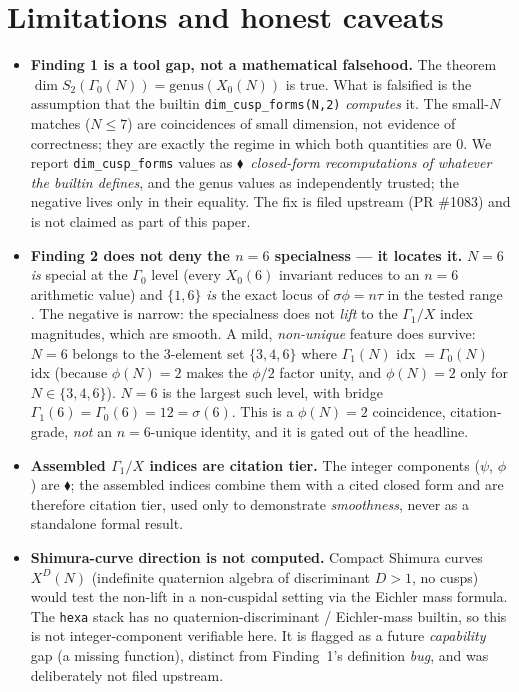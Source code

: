 \documentclass[11pt,a4paper]{article}
\newcommand{\tierF}{\textcolor{blue!60!black}{$\blacklozenge$}}   %
\newcommand{\sig}{\sigma}
\newcommand{\Gz}{\Gamma_0}
\newcommand{\Go}{\Gamma_1}
\theoremstyle{definition}
\begin{document}
\section{Limitations and honest caveats}
\label{sec:caveats}

\begin{itemize}\itemsep0.3em
\item \textbf{Finding 1 is a tool gap, not a mathematical falsehood.} The
theorem $\dim S_2(\Gz(N))=\mathrm{genus}(X_0(N))$ is true. What is falsified is
the assumption that the builtin \texttt{dim\_cusp\_forms(N,2)} \emph{computes}
it. The small-$N$ matches ($N\le 7$) are coincidences of small dimension, not
evidence of correctness; they are exactly the regime in which both quantities are
$0$. We report \texttt{dim\_cusp\_forms} values as \tierF\ \emph{closed-form
recomputations of whatever the builtin defines}, and the genus values as
independently trusted; the negative lives only in their equality. The fix is
filed upstream (PR \#1083) and is not claimed as part of this paper.

\item \textbf{Finding 2 does not deny the $n=6$ specialness --- it locates it.}
$N=6$ \emph{is} special at the $\Gz$ level (every $X_0(6)$ invariant reduces to
an $n=6$ arithmetic value) and $\{1,6\}$ \emph{is} the exact locus of
$\sig\phi=n\tau$ in the tested range \citep{tecs-l-locus}. The negative is
narrow: the specialness does not \emph{lift} to the $\Go/X$ index magnitudes,
which are smooth. A mild, \emph{non-unique} feature does survive: $N=6$ belongs
to the $3$-element set $\{3,4,6\}$ where $\Go(N)$ idx $=\Gz(N)$ idx (because
$\phi(N)=2$ makes the $\phi/2$ factor unity, and $\phi(N)=2$ only for
$N\in\{3,4,6\}$). $N=6$ is the largest such level, with bridge
$\Go(6)=\Gz(6)=12=\sig(6)$. This is a $\phi(N)=2$ coincidence, citation-grade,
\emph{not} an $n=6$-unique identity, and it is gated out of the headline.

\item \textbf{Assembled $\Go/X$ indices are citation tier.} The integer
components ($\psi$, $\phi$) are \tierF; the assembled indices combine them with a
cited closed form and are therefore citation tier, used only to demonstrate
\emph{smoothness}, never as a standalone formal result.

\item \textbf{Shimura-curve direction is not computed.} Compact Shimura curves
$X^D(N)$ (indefinite quaternion algebra of discriminant $D>1$, no cusps) would
test the non-lift in a non-cuspidal setting via the Eichler mass formula. The
\texttt{hexa} stack has no quaternion-discriminant / Eichler-mass builtin, so
this is not integer-component verifiable here. It is flagged as a future
\emph{capability} gap (a missing function), distinct from Finding~1's definition
\emph{bug}, and was deliberately not filed upstream.


\end{itemize}
\end{document}
